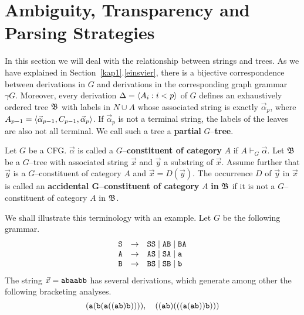 \section{Ambiguity, Transparency and Parsing Strategies}
\label{kap2-4}
%
%
%
In this section we will deal with the relationship between strings
and trees. As we have explained in Section~\ref{kap1}.\ref{einsvier}, 
there is a bijective correspondence between derivations in $G$ and
derivations in the corresponding graph grammar $\gamma G$.
Moreover, every derivation $\Delta = \langle A_i : i < p\rangle$
of $G$ defines an exhaustively ordered tree $\mathfrak{B}$ with labels in
$N \cup A$ whose associated string is exactly $\vec{\alpha}_{p}$, 
where $A_{p-1} = \langle \vec{\alpha}_{p-1}, C_{p-1}, \vec{\alpha}_p\rangle$.
If $\vec{\alpha}_p$ is not a terminal string, the labels of the 
leaves are also not all terminal. We call such a tree a 
\textbf{partial} $G$--\textbf{tree}.
\begin{defn}
Let $G$ be a CFG. $\vec{\alpha}$ is called a
$G$--\textbf{constituent of category} $A$ if $A \vdash_G \vec{\alpha}$.
Let $\mathfrak{B}$ be a $G$--tree with associated string $\vec{x}$ and
$\vec{y}$ a substring of $\vec{x}$. Assume further that $\vec{y}$
is a $G$--constituent of category $A$ and $\vec{x} = D(\vec{y})$.
The occurrence $D$ of $\vec{y}$ in $\vec{x}$ is called an
\textbf{accidental G--constituent of category} $A$ 
\textbf{in} $\mathfrak{B}$ if it is not a $G$--constituent of category 
$A$ in $\mathfrak{B}$.
\end{defn}
We shall illustrate this terminology with an example. Let $G$
be the following grammar.
\begin{equation}
\begin{array}{l@{\quad\pf\quad}l}
\mbox{\tt S} & \mbox{\tt SS} \mid \mbox{\tt AB} \mid \mbox{\tt BA} \\
\mbox{\tt A} & \mbox{\tt AS} \mid \mbox{\tt SA} \mid \mbox{\tt a} \\
\mbox{\tt B} & \mbox{\tt BS} \mid \mbox{\tt SB} \mid \mbox{\tt b}
\end{array}
\end{equation}
The string $\vec{x} = \mbox{\tt abaabb}$ has several derivations,
which generate among other the following bracketing analyses.
\begin{equation}
(\mbox{\tt a}(\mbox{\tt b}(\mbox{\tt a}((%
\mbox{\tt ab})\mbox{\tt b})))), \quad
((\mbox{\tt ab})(((\mbox{\tt a}(\mbox{\tt ab}))\mbox{\tt b})))
\end{equation}
